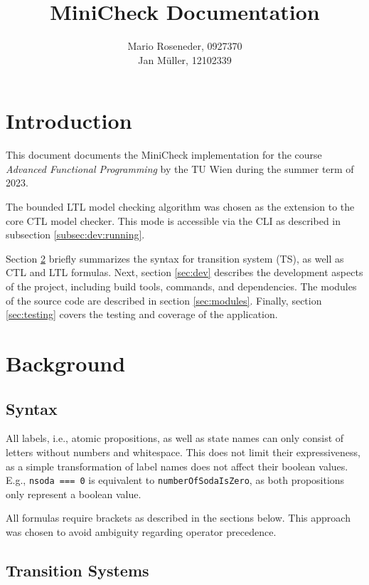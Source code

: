 \documentclass[11pt]{article}
\title{MiniCheck Documentation}
\author{Mario Roseneder, 0927370\\ Jan M\"uller, 12102339}
\begin{document}
\maketitle

\section{Introduction}

This document documents the MiniCheck implementation for the course \textit{Advanced Functional Programming} by the TU Wien during the summer term of 2023.

The bounded LTL model checking algorithm was chosen as the extension to the core CTL model checker.
This mode is accessible via the CLI as described in subsection \ref{subsec:dev:running}.

Section \ref{sec:background} briefly summarizes the syntax for transition system (TS), as well as CTL and LTL formulas.
Next, section \ref{sec:dev} describes the development aspects of the project, including build tools, commands, and dependencies.
The modules of the source code are described in section \ref{sec:modules}.
Finally, section \ref{sec:testing} covers the testing and coverage of the application.

\section{Background}
\label{sec:background}

\subsection{Syntax}

All labels, i.e., atomic propositions, as well as state names can only consist of letters without numbers and whitespace.
This does not limit their expressiveness, as a simple transformation of label names does not affect their boolean values.
E.g., \verb|nsoda === 0| is equivalent to \verb|numberOfSodaIsZero|, as both propositions only represent a boolean value.

All formulas require brackets as described in the sections below.
This approach was chosen to avoid ambiguity regarding operator precedence.

\subsection{Transition Systems}
\end{document}
